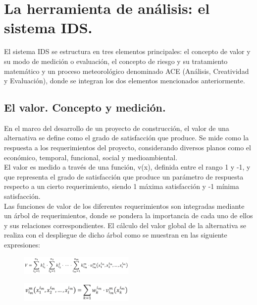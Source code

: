\documentclass[10pt]{article}
\begin{document}
	
\section{La herramienta de análisis: el sistema IDS.}

El sistema IDS se estructura en tres elementos principales: el concepto de valor y su modo de medición o evaluación, el concepto de riesgo y su tratamiento matemático y un proceso meteorológico denominado ACE (Análisis, Creatividad y Evaluación), donde se integran los dos elementos mencionados anteriormente.


\subsection{El valor. Concepto y medición.}

En el marco del desarrollo de un proyecto de construcción, el valor de una alternativa se define como el grado de satisfacción que produce. Se mide como la respuesta a los requerimientos del proyecto, considerando diversos planos como el económico, temporal, funcional, social y medioambiental.\\

	El valor es medido a través de una función, v(x), definida entre el rango 1 y -1, y que representa el grado de satisfacción que produce un parámetro de respuesta respecto a un cierto requerimiento, siendo 1 máxima satisfacción y -1 mínima satisfacción.\\

	Las funciones de valor de los diferentes requerimientos son integradas mediante un árbol de requerimientos, donde se pondera la importancia de cada uno de ellos y sus relaciones correspondientes. El cálculo del valor global de la alternativa se realiza con el despliegue de dicho árbol como se muestran en las siguiente expresiones:
	
\begin{figure}[H]
	\begin{center}
 		\includegraphics[width = 0.5\textwidth]{Imagenes/expresion1.eps}
	\end{center} 
\end{figure}

\begin{figure}[H]
	\begin{center}
 		\includegraphics[width = 0.5\textwidth]{Imagenes/expresion2.eps}
	\end{center} 
\end{figure}
\end{document}
